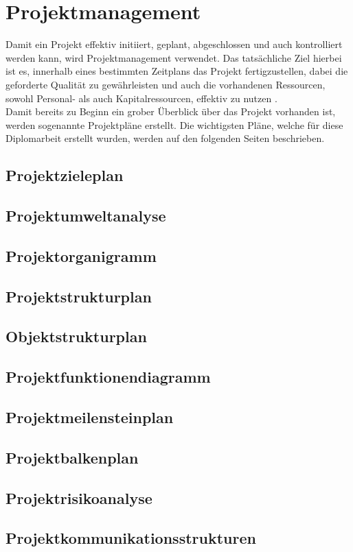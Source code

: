 \ifoot{\mangeng}
\chapter{Projektmanagement}
Damit ein Projekt effektiv initiiert, geplant, abgeschlossen und auch kontrolliert werden kann, wird Projektmanagement verwendet. Das tatsächliche Ziel hierbei ist es, innerhalb eines bestimmten Zeitplans das Projekt fertigzustellen, dabei die geforderte Qualität zu gewährleisten und auch die vorhandenen Ressourcen, sowohl Personal- als auch Kapitalressourcen, effektiv zu nutzen \cite[vgl.][]{refa:o.J.}.\\
Damit bereits zu Beginn ein grober Überblick über das Projekt vorhanden ist, werden sogenannte Projektpläne erstellt. Die wichtigsten Pläne, welche für diese Diplomarbeit erstellt wurden, werden auf den folgenden Seiten beschrieben.
\section{Projektzieleplan}


\newpage
\newpage
\section{Projektumweltanalyse}


\section{Projektorganigramm}


\section{Projektstrukturplan}


\section{Objektstrukturplan}


\section{Projektfunktionendiagramm}


\section{Projektmeilensteinplan}


\section{Projektbalkenplan}


\section{Projektrisikoanalyse}


\section{Projektkommunikationsstrukturen}



